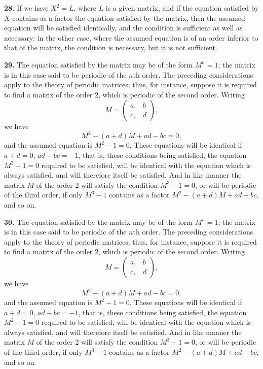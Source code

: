 \documentclass[12pt,a4paper]{article}
\theoremstyle{definition}
\begin{document}
\medskip
\noindent\textbf{28.} If we have $X^2 = L$, where $L$ is a given matrix, and if the equation satisfied by $X$ contains as a factor the equation satisfied by the matrix, then the assumed equation will be satisfied identically, and the condition is sufficient as well as necessary: in the other case, where the assumed equation is of an order inferior to that of the matrix, the condition is necessary, but it is not sufficient.

\medskip
\noindent\textbf{29.} The equation satisfied by the matrix may be of the form $M^n = 1$; the matrix is in this case said to be periodic of the $n$th order. The preceding considerations apply to the theory of periodic matrices; thus, for instance, suppose it is required to find a matrix of the order 2, which is periodic of the second order. Writing
\[
M = \begin{pmatrix} a, & b \\ c, & d \end{pmatrix},
\]
we have
\[M^2 - (a+d)M + ad-bc = 0,\]
and the assumed equation is $M^2 - 1 = 0$. These equations will be identical if $a+d=0$, $ad-bc=-1$, that is, these conditions being satisfied, the equation $M^2-1=0$ required to be satisfied, will be identical with the equation which is always satisfied, and will therefore itself be satisfied. And in like manner the matrix $M$ of the order 2 will satisfy the condition $M^3-1=0$, or will be periodic of the third order, if only $M^3-1$ contains as a factor $M^2-(a+d)M+ad-bc$, and so on.

\medskip
\noindent\textbf{30.} The equation satisfied by the matrix may be of the form $M^n = 1$; the matrix is in this case said to be periodic of the $n$th order. The preceding considerations apply to the theory of periodic matrices; thus, for instance, suppose it is required to find a matrix of the order 2, which is periodic of the second order. Writing
\[
M = \begin{pmatrix} a, & b \\ c, & d \end{pmatrix},
\]
we have
\[M^2 - (a+d)M + ad-bc = 0,\]
and the assumed equation is $M^2 - 1 = 0$. These equations will be identical if $a+d=0$, $ad-bc=-1$, that is, these conditions being satisfied, the equation $M^2-1=0$ required to be satisfied, will be identical with the equation which is always satisfied, and will therefore itself be satisfied. And in like manner the matrix $M$ of the order 2 will satisfy the condition $M^3-1=0$, or will be periodic of the third order, if only $M^3-1$ contains as a factor $M^2-(a+d)M+ad-bc$, and so on.
\end{document}
